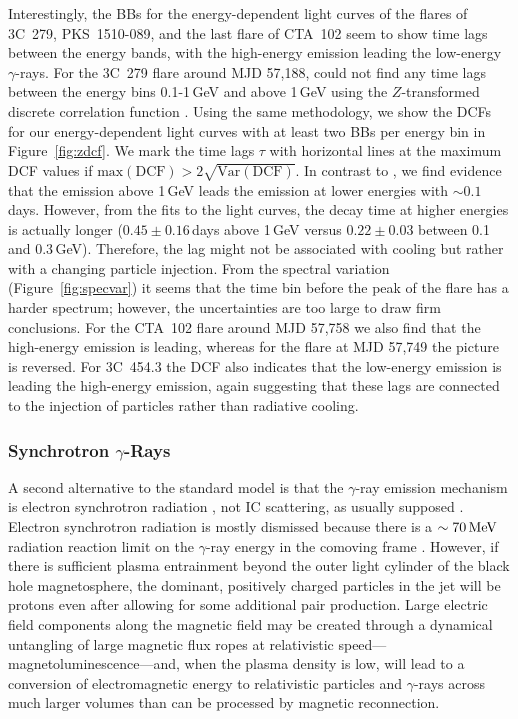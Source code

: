 \documentclass[twocolumn]{aastex62}
\newcommand{\Grays}{$\gamma$-rays\xspace}
\newcommand{\GRays}{$\gamma$-Rays\xspace}
\newcommand{\gray}{$\gamma$-ray\xspace}
\begin{document}
Interestingly, the BBs for the energy-dependent light curves of the flares of 3C~279, PKS~1510-089, and the last flare of CTA~102 seem to show time lags between the energy bands, with the high-energy emission leading the low-energy \Grays.
For the 3C~279 flare around MJD 57,188, \citet{2015ApJ...808L..48P} could not find any time lags between the energy bins 0.1-1\,GeV and above 1\,GeV using the $Z$-transformed discrete correlation function \citep[DCF;][]{1997ASSL..218..163A,2013arXiv1302.1508A}.
Using the same methodology, we show the DCFs for our energy-dependent light curves with at least two BBs per energy bin in Figure~\ref{fig:zdcf}.
We mark the time lags $\tau$ with horizontal lines at the maximum DCF values if $\mathrm{max}(\mathrm{DCF}) > 2 \sqrt{\mathrm{Var}(\mathrm{DCF})}$.
In contrast to \citet{2015ApJ...808L..48P}, we find evidence that the emission above 1\,GeV leads the emission at lower energies with $\sim 0.1$\,days. 
However, from the fits to the light curves, the decay time at higher energies is actually longer ($0.45\pm0.16$\,days above 1\,GeV versus $0.22 \pm 0.03$ between 0.1 and 0.3\,GeV). 
Therefore, the lag might not be associated with cooling but rather with a changing particle injection. 
From the spectral variation (Figure~\ref{fig:specvar}) it seems that the time bin before the peak of the flare has a harder spectrum; however, the uncertainties are too large to draw firm conclusions.
For the CTA~102 flare around MJD 57,758 we also find that the high-energy emission is leading, whereas for the flare at MJD 57,749 the picture is reversed. 
For 3C~454.3 the DCF also indicates that the low-energy emission is leading the high-energy emission, again suggesting that these lags are connected to the injection of particles rather than radiative cooling.

\subsubsection{Synchrotron \GRays}
\label{sec:gammasync}

A second alternative to the standard model is that the \gray emission mechanism is electron synchrotron radiation \citep{TheFermi-LAT:2016dss}, not IC scattering, as usually supposed \citep[e.g.,][]{Madejski:2016oqg}.
Electron synchrotron radiation is mostly dismissed because there is a $\sim70\,{\rm MeV}$ radiation reaction limit on the \gray energy in the comoving frame \citep[e.g.,][]{1975ctf..book.....L,blandford:2017mag}. 
However, if there is sufficient plasma entrainment beyond the outer light cylinder of the black hole magnetosphere, the dominant, positively charged particles in the jet will be protons even after allowing for some additional pair production. 
Large electric field components along the magnetic field may be created through a dynamical untangling of large magnetic flux ropes at relativistic speed---magnetoluminescence---and, when the plasma density is low, will lead to a conversion of electromagnetic energy to relativistic particles and \Grays across much larger volumes than can be processed by magnetic reconnection. 
\end{document}
